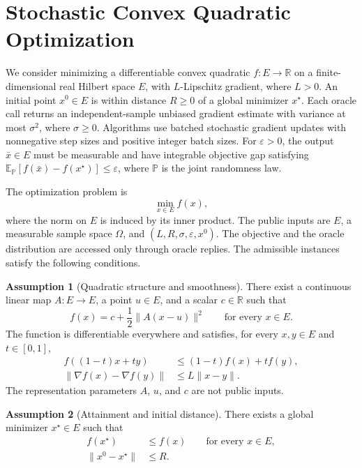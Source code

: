 \documentclass[10pt]{article}
\theoremstyle{definition}
\newtheorem{assumption}{Assumption}
\begin{document}
\section*{Stochastic Convex Quadratic Optimization}
We consider minimizing a differentiable convex quadratic $f:E\to\mathbb{R}$ on a finite-dimensional real Hilbert space $E$, with $L$-Lipschitz gradient, where $L>0$. An initial point $x^0\in E$ is within distance $R\geq0$ of a global minimizer $x^\star$. Each oracle call returns an independent-sample unbiased gradient estimate with variance at most $\sigma^2$, where $\sigma\geq0$. Algorithms use batched stochastic gradient updates with nonnegative step sizes and positive integer batch sizes. For $\varepsilon>0$, the output $\bar{x}\in E$ must be measurable and have integrable objective gap satisfying $\mathbb{E}_{\mathbb{P}}[f(\bar{x})-f(x^\star)]\leq\varepsilon$, where $\mathbb{P}$ is the joint randomness law.

The optimization problem is
\[
\min_{x\in E} f(x),
\]
where the norm on $E$ is induced by its inner product. The public inputs are $E$, a measurable sample space $\Omega$, and $(L,R,\sigma,\varepsilon,x^0)$. The objective and the oracle distribution are accessed only through oracle replies. The admissible instances satisfy the following conditions.

\begin{assumption}[Quadratic structure and smoothness]
There exist a continuous linear map $A:E\to E$, a point $u\in E$, and a scalar $c\in\mathbb{R}$ such that
\[
f(x)=c+\frac12\|A(x-u)\|^2
\qquad\text{for every }x\in E.
\]
The function is differentiable everywhere and satisfies, for every $x,y\in E$ and $t\in[0,1]$,
\begin{align*}
f((1-t)x+ty)&\leq(1-t)f(x)+tf(y),\\
\|\nabla f(x)-\nabla f(y)\|&\leq L\|x-y\|.
\end{align*}
The representation parameters $A$, $u$, and $c$ are not public inputs.
\end{assumption}

\begin{assumption}[Attainment and initial distance]
There exists a global minimizer $x^\star\in E$ such that
\begin{align*}
f(x^\star)&\leq f(x)\qquad\text{for every }x\in E,\\
\|x^0-x^\star\|&\leq R.
\end{align*}
\end{assumption}
\end{document}

